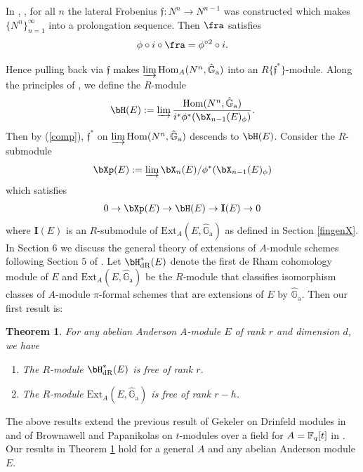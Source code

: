 \documentclass{amsart}
\newtheorem {theorem} {\bf{Theorem}}[section]
\numberwithin {equation}{section}
\newcommand{\map}{\rightarrow}
\newcommand{\mfrak}[1]{\mathfrak{#1}}
\def \hG{\hat{\mathbb{G}}_{\mathrm{a}}}
\newcommand{\Hom}{\mathrm{Hom}}
\newcommand{\Ext}{\mathrm{Ext}}
\begin{document}

In \cite{BS b}, \cite{BS a}, for all $n$ the lateral Frobenius $\mfrak{f}:
N^n \map N^{n-1}$ was constructed which makes $\{N^n\}_{n=1}^\infty$
into a prolongation sequence. Then $\fra$ satisfies 
\begin{align}
\label{comp}
\phi \circ i \circ \fra = \phi^{\circ 2} \circ i.
\end{align}

Hence pulling back via $\mfrak{f}$ makes
$\varinjlim \Hom_A(N^n,\hG)$ into an $R\{\mfrak{f}^*\}$-module.  
Along the principles of \cite{BS b}, we define the $R$-module
	$$
	\bH(E) 	:= 
	 \varinjlim\frac{\Hom(N^n,\hG)}{i^*\phi^*(\bX_{n-1}(E)_{\phi})}.
	$$
Then by (\ref{comp}), $\mfrak{f}^*$ on $\varinjlim \Hom(N^n,\hG)$ 
descends to $\bH(E)$. Consider the $R$-submodule 
	$$
	\bXp(E):= \varinjlim \bX_n(E)/\phi^*(\bX_{n-1}(E)_{\phi})
	$$	
which satisfies 
\begin{align}
\label{Xpshort}
0 \map \bXp(E) \map \bH(E) \map \mathbf{I}(E) \map 0
\end{align}
where ${\mathbf{I}}(E)$ is an $R$-submodule of $\Ext_A(E,\hG)$ as defined in
Section \ref{fingenX}.
In Section $6$ we discuss the general theory of extensions of $A$-module 
schemes following Section $5$ of \cite{Gekeler_a}. Let 
$\bH^{*}_{\mathrm{dR}}(E)$ 
denote the first de Rham cohomology module of $E$ and $\Ext_A(E,\hG)$ be the 
$R$-module that classifies isomorphism classes of
 $A$-module $\pi$-formal schemes that 
are extensions of $E$ by $\hG$. Then our first result is:
\begin{theorem} \label{intro-ext-derham}
For any abelian Anderson $A$-module $E$ of rank $r$ and dimension $d$,
we have
\begin{enumerate}
\item The $R$-module $\bH^{*}_{\mathrm{dR}}(E)$ 
 is free of rank $r$.
\item The $R$-module $\Ext_A(E,\hG)$ is free of rank $r-h$. 
\end{enumerate}
\end{theorem}
The above results extend the previous result of Gekeler on Drinfeld modules in \cite{Gekeler_b} and of Brownawell and Papanikolas on $t$-modules over a field for $A=\mathbb{F}_{q}[t]$  in \cite{BrPa}. Our results in Theorem \ref{intro-ext-derham} hold for a general $A$ and any abelian Anderson module $E$. 
 
\end{document}
